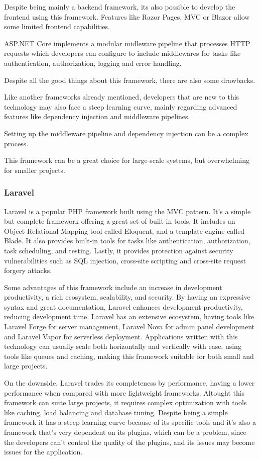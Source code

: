Despite being mainly a backend framework, its also possible to develop the
frontend using this framework. Features like Razor Pages, \gls{MVC} or Blazor allow
some limited frontend capabilities.

ASP.NET Core implements a modular midleware pipeline that processes \gls{HTTP}
requests which developers can configure to include middlewares for tasks like
authentication, authorization, logging and error handling.

Despite all the good things about this framework, there are also some drawbacks.

Like another frameworks already mentioned, developers that are new to this
technology may also face a steep learning curve, mainly regarding advanced
features like dependency injection and middleware pipelines.

Setting up the middleware pipeline and dependency injection can be a complex
process.

This framework can be a great choice for large-scale systems, but overwhelming
for smaller projects.
\subsubsection{Laravel}
Laravel is a popular \gls{PHP} framework built using the \gls{MVC}
pattern. It's a simple but complete framework offering a great set of built-in
tools. It includes an Object-Relational Mapping tool called Eloquent, and a
template engine called Blade. It also provides built-in tools for tasks like
authentication, authorization, task scheduling, and testing. Lastly, it
provides protection against security vulnerabilities such as \gls{SQL} injection,
cross-site scripting and cross-site request forgery attacks.

Some advantages of this framework include an increase in development
productivity, a rich ecosystem, scalability, and security.
By having an expressive syntax and great documentation, Laravel enhances
development productivity, reducing development time.
Laravel has an extensive ecosystem, having tools like Laravel Forge for server
management, Laravel Nova for admin panel development and Laravel Vapor for
serverless deployment.
Applications written with this technology can usually scale both horizontally
and vertically with ease, using tools like queues and caching, making this
framework suitable for both small and large projects.

On the downside, Laravel trades its completeness by performance, having a
lower performance when compared with more lightweight frameworks.
Altought this framework can suite large projects, it requires complex
optimization with tools like caching, load balancing and database tuning.
Despite being a simple framework it has a steep learning curve because of its
specific tools and it's also a framework that's very dependent on its plugins,
which can be a problem, since the developers can't control the quality of the
plugins, and its issues may become issues for the application.

